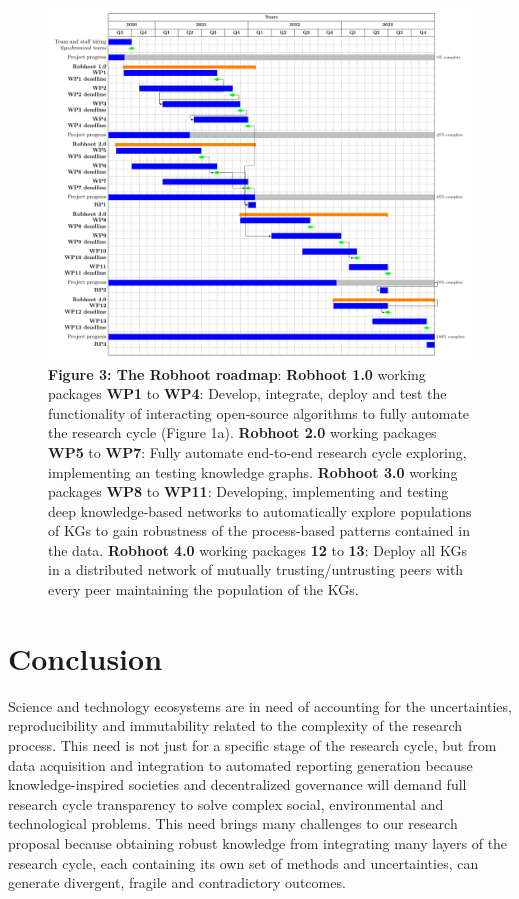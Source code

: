 \documentclass[10pt, a4paper, twocolumn]{article} %
\begin{document}
{\begin{figure}[ht]
  \centering \includegraphics[width=1\textwidth]{GanttChart.pdf}
  {\small {\bf Figure 3: The Robhoot roadmap}: {\bf Robhoot 1.0}
    working packages {\bf WP1} to {\bf WP4}: Develop, integrate,
    deploy and test the functionality of interacting open-source
    algorithms to fully automate the research cycle (Figure 1a). {\bf
      Robhoot 2.0} working packages {\bf WP5} to {\bf WP7}: Fully
    automate end-to-end research cycle exploring, implementing an
    testing knowledge graphs. {\bf Robhoot 3.0} working packages {\bf
      WP8} to {\bf WP11}: Developing, implementing and testing deep
    knowledge-based networks to automatically explore populations of
    KGs to gain robustness of the process-based patterns contained in
    the data. {\bf Robhoot 4.0} working packages {\bf 12} to {\bf 13}:
    Deploy all KGs in a distributed network of mutually
    trusting/untrusting peers with every peer maintaining the
    population of the KGs.}
\end{figure}


\section{Conclusion}
Science and technology ecosystems are in need of accounting for the
uncertainties, reproducibility and immutability related to the
complexity of the research process. This need is not just for a
specific stage of the research cycle, but from data acquisition and
integration to automated reporting generation because
knowledge-inspired societies and decentralized governance will demand
full research cycle transparency to solve complex social,
environmental and technological problems. This need brings many
challenges to our research proposal because obtaining robust knowledge
from integrating many layers of the research cycle, each containing
its own set of methods and uncertainties, can generate divergent,
fragile and contradictory outcomes.

}
\end{document}
